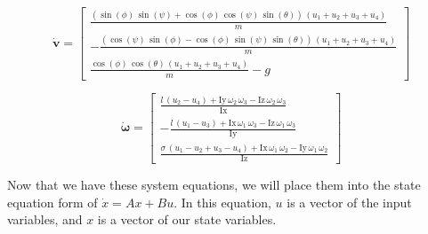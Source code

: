 \documentclass{article}
\begin{document}
\begin{equation}
    \dot{\boldsymbol{v}} = 
    \begin{bmatrix}
        \frac{{\left(\sin \left(\phi \right)\,\sin \left(\psi \right)+\cos \left(\phi \right)\,\cos \left(\psi \right)\,\sin \left(\theta \right)\right)}\,{\left(u_1 +u_2 +u_3 +u_4 \right)}}{m}\\
        -\frac{{\left(\cos \left(\psi \right)\,\sin \left(\phi \right)-\cos \left(\phi \right)\,\sin \left(\psi \right)\,\sin \left(\theta \right)\right)}\,{\left(u_1 +u_2 +u_3 +u_4 \right)}}{m}\\
        \frac{\cos \left(\phi \right)\,\cos \left(\theta \right)\,{\left(u_1 +u_2 +u_3 +u_4 \right)}}{m}-g
    \end{bmatrix}
\end{equation}

\begin{equation}
    \dot{\boldsymbol{\omega}} = 
    \begin{bmatrix}
        \frac{l\,{\left(u_2 -u_4 \right)}+\mathrm{Iy}\,\omega_2 \,\omega_3 -\mathrm{Iz}\,\omega_2 \,\omega_3 }{\mathrm{Ix}}\\
        -\frac{l\,{\left(u_1 -u_3 \right)}+\mathrm{Ix}\,\omega_1 \,\omega_3 -\mathrm{Iz}\,\omega_1 \,\omega_3 }{\mathrm{Iy}}\\
        \frac{\sigma \,{\left(u_1 -u_2 +u_3 -u_4 \right)}+\mathrm{Ix}\,\omega_1 \,\omega_2 -\mathrm{Iy}\,\omega_1 \,\omega_2 }{\mathrm{Iz}}
    \end{bmatrix}
\end{equation}

Now that we have these system equations, we will place them into the state equation form of $\dot{x} = Ax + Bu$. In this equation, $u$ is a vector of the input variables, and $x$ is a vector of our state variables.
\end{document}
